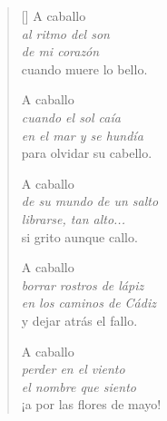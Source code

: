 \documentclass[a4paper,11pt]{article}
\begin{document}

\settowidth{\versewidth}{borrar rostros de lápiz}

\bigskip

\begin{verse}[\versewidth]
  A caballo \\
  \qquad \emph{al ritmo del son} \\
  \qquad \emph{de mi corazón} \\
  cuando muere lo bello.

  A caballo \\
  \qquad \emph{cuando el sol caía} \\
  \qquad \emph{en el mar y se hundía} \\
  para olvidar su cabello.

  A caballo \\
  \qquad \emph{de su mundo de un salto} \\
  \qquad \emph{librarse, tan alto...} \\
  si grito aunque callo.

  A caballo \\
  \qquad \emph{borrar rostros de lápiz} \\
  \qquad \emph{en los caminos de Cádiz} \\
  y dejar atrás el fallo.

  A caballo \\
  \qquad \emph{perder en el viento} \\
  \qquad \emph{el nombre que siento} \\
  ¡a por las flores de mayo!
\end{verse}


\end{document}
